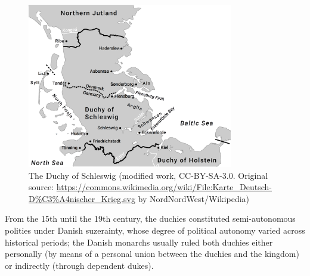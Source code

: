 \documentclass[output=paper]{langsci/langscibook}
\begin{document}
\begin{figure}
\includegraphics[width=0.8\textwidth]{figures/hoeder-map.png}
\caption{The Duchy of Schleswig (modified work, CC-BY-SA-3.0. Original source: \url{https://commons.wikimedia.org/wiki/File:Karte_Deutsch-D\%C3\%A4nischer_Krieg.svg} by NordNordWest/Wikipedia)}\label{fig:hoeder:1}
\end{figure}

From the 15th until the 19th century, the duchies constituted semi-autonomous polities under Danish suzerainty, whose degree of political autonomy varied across historical periods; the Danish monarchs usually ruled both duchies either personally (by means of a personal union between the duchies and the kingdom) or indirectly (through dependent dukes).
\end{document}
